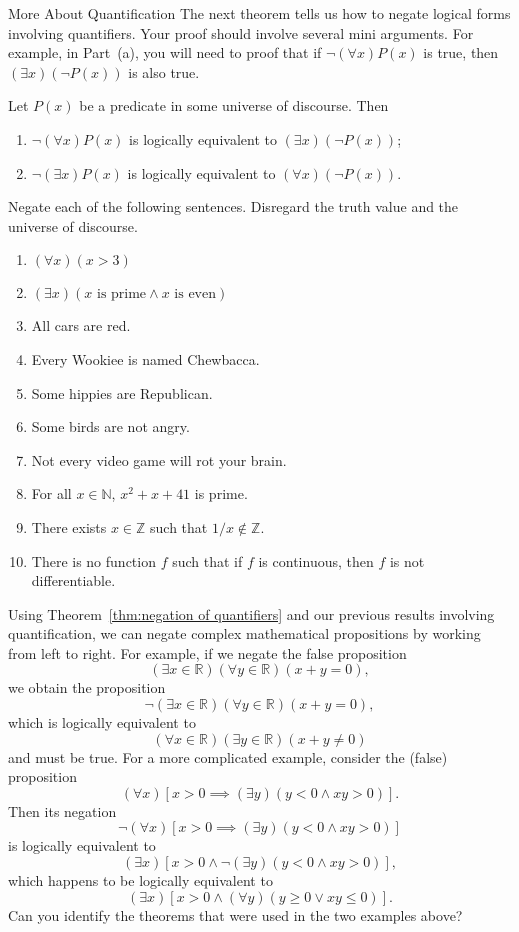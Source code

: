 \begin{section}{More About Quantification}
The next theorem tells us how to negate logical forms involving quantifiers. Your proof should involve several mini arguments. For example, in Part~(a), you will need to proof that if $\neg (\forall x)P(x)$ is true, then $(\exists x)(\neg P(x))$ is also true.

\begin{theorem}\label{thm:negation of quantifiers}
Let $P(x)$ be a predicate in some universe of discourse.  Then
\begin{enumerate}[label=\textrm{(\alph*)}]
\item $\neg (\forall x)P(x)$ is logically equivalent to $(\exists x)(\neg P(x))$;
\item $\neg (\exists x)P(x)$ is logically equivalent to $(\forall x)(\neg P(x))$.
\end{enumerate}
\end{theorem}

\begin{problem}
Negate each of the following sentences.  Disregard the truth value and the universe of discourse.
\begin{enumerate}[label=\textrm{(\alph*)}]
\item $(\forall x)(x>3)$
\item $(\exists x)(x \mbox{ is prime}\wedge x \mbox{ is even})$
\item All cars are red.
\item Every Wookiee is named Chewbacca.
\item Some hippies are Republican.
\item Some birds are not angry.
\item Not every video game will rot your brain.
\item For all $x\in\mathbb{N}$, $x^2+x+41$ is prime.
\item There exists $x\in\mathbb{Z}$ such that $1/x\notin\mathbb{Z}$.
\item There is no function $f$ such that if $f$ is continuous, then $f$ is not differentiable.
\end{enumerate}
\end{problem}

Using Theorem~\ref{thm:negation of quantifiers} and our previous results involving quantification, we can negate complex mathematical propositions by working from left to right. For example, if we negate the false proposition
\[
(\exists x\in\mathbb{R})(\forall y\in\mathbb{R})(x+y=0),
\]
we obtain the proposition
\[
\neg(\exists x\in\mathbb{R})(\forall y\in\mathbb{R})(x+y=0),
\]
which is logically equivalent to
\[
(\forall x\in\mathbb{R})(\exists y\in\mathbb{R})(x+y\neq 0)
\]
and must be true. For a more complicated example, consider the (false) proposition
\[
(\forall x)[x>0\implies (\exists y)(y<0 \wedge xy>0)].
\]
Then its negation
\[
\neg (\forall x)[x>0\implies (\exists y)(y<0 \wedge xy>0)]
\]
is logically equivalent to
\[
(\exists x)[x>0 \wedge \neg (\exists y)(y<0 \wedge xy>0)],
\]
which happens to be logically equivalent to
\[
(\exists x)[x>0 \wedge (\forall y)(y\geq 0 \vee xy\leq 0)].
\]
Can you identify the theorems that were used in the two examples above?


\end{section}

